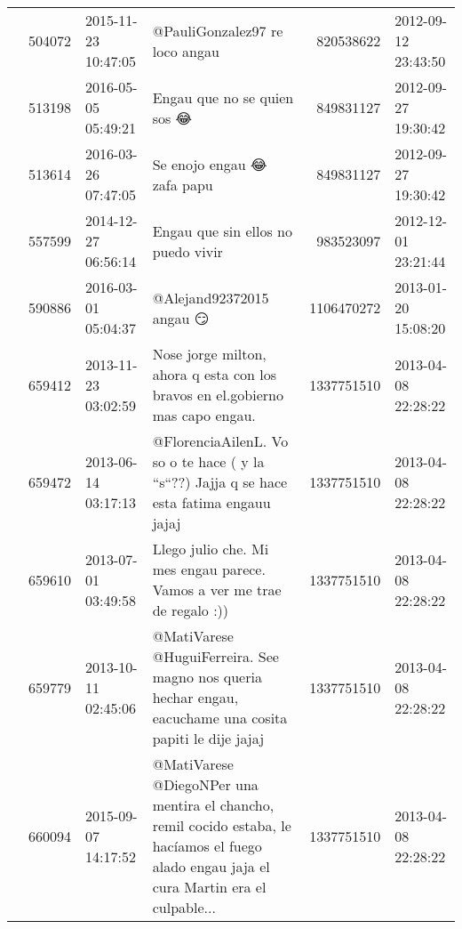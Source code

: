 \begin{tabular}{llllrl}
           & 504072  & 2015-11-23 10:47:05 &                                                                                                               @PauliGonzalez97 re loco angau &   820538622 & 2012-09-12 23:43:50 \\
           & 513198  & 2016-05-05 05:49:21 &                                                                                                                  Engau que no se quien sos 😂 &   849831127 & 2012-09-27 19:30:42 \\
           & 513614  & 2016-03-26 07:47:05 &                                                                                                                   Se enojo engau 😂 zafa papu &   849831127 & 2012-09-27 19:30:42 \\
           & 557599  & 2014-12-27 06:56:14 &                                                                                                           Engau que sin ellos no puedo vivir &   983523097 & 2012-12-01 23:21:44 \\
           & 590886  & 2016-03-01 05:04:37 &                                                                                                                     @Alejand92372015 angau 😏 &  1106470272 & 2013-01-20 15:08:20 \\
           & 659412  & 2013-11-23 03:02:59 &                                                                Nose jorge milton, ahora q esta con los bravos en el.gobierno mas capo engau. &  1337751510 & 2013-04-08 22:28:22 \\
           & 659472  & 2013-06-14 03:17:13 &                                                   @FlorenciaAilenL. Vo so o te hace ( y la ``s``??) Jajja q se hace esta fatima engauu jajaj &  1337751510 & 2013-04-08 22:28:22 \\
           & 659610  & 2013-07-01 03:49:58 &                                                                      Llego julio che. Mi mes engau parece. Vamos a ver me trae de regalo :)) &  1337751510 & 2013-04-08 22:28:22 \\
           & 659779  & 2013-10-11 02:45:06 &                                     @MatiVarese @HuguiFerreira. See magno nos queria hechar engau, eacuchame una cosita papiti le dije jajaj &  1337751510 & 2013-04-08 22:28:22 \\
           & 660094  & 2015-09-07 14:17:52 &  @MatiVarese @DiegoNPer una mentira el chancho, remil cocido estaba, le hacíamos el fuego alado engau jaja el cura Martin era el culpable... &  1337751510 & 2013-04-08 22:28:22 \\

\end{tabular}
